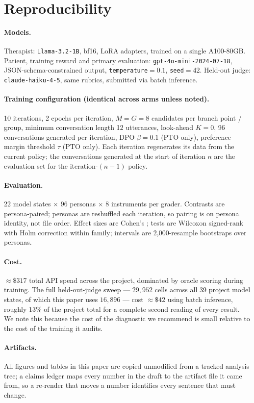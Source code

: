 \section{Reproducibility}
\label{app:repro}

\paragraph{Models.} Therapist: \texttt{Llama-3.2-1B}, bf16, LoRA adapters, trained on a single
A100-80GB. Patient, training reward and primary evaluation: \texttt{gpt-4o-mini-2024-07-18},
JSON-schema-constrained output, \texttt{temperature}$=0.1$, \texttt{seed}$=42$. Held-out judge:
\texttt{claude-haiku-4-5}, same rubrics, submitted via batch inference.

\paragraph{Training configuration (identical across arms unless noted).} 10 iterations,
2 epochs per iteration, $M=G=8$ candidates per branch point / group, minimum conversation
length 12 utterances, look-ahead $K=0$, 96 conversations generated per iteration,
DPO $\beta=0.1$ (PTO only), preference margin threshold $\tau$ (PTO only). Each iteration
regenerates its data from the current policy; the conversations generated at the start of
iteration $n$ are the evaluation set for the iteration-$(n{-}1)$ policy.

\paragraph{Evaluation.} 22 model states $\times$ 96 personas $\times$ 8 instruments per grader.
Contrasts are persona-paired; personas are reshuffled each iteration, so pairing is on persona
identity, not file order. Effect sizes are Cohen's \dz{}; tests are Wilcoxon signed-rank with
Holm correction within family; intervals are 2{,}000-resample bootstraps over personas.

\paragraph{Cost.} ${\approx}\$317$ total API spend across the project, dominated by oracle
scoring during training. The full held-out-judge sweep --- $29{,}952$ cells across all 39 project
model states, of which this paper uses $16{,}896$ --- cost ${\approx}\$42$ using batch inference,
roughly $13\%$ of the project total for a complete second reading of every result. We note this because the cost of the diagnostic we recommend is small relative to
the cost of the training it audits.

\paragraph{Artifacts.} All figures and tables in this paper are copied unmodified from a
tracked analysis tree; a claims ledger maps every number in the draft to the artifact file it
came from, so a re-render that moves a number identifies every sentence that must change.
